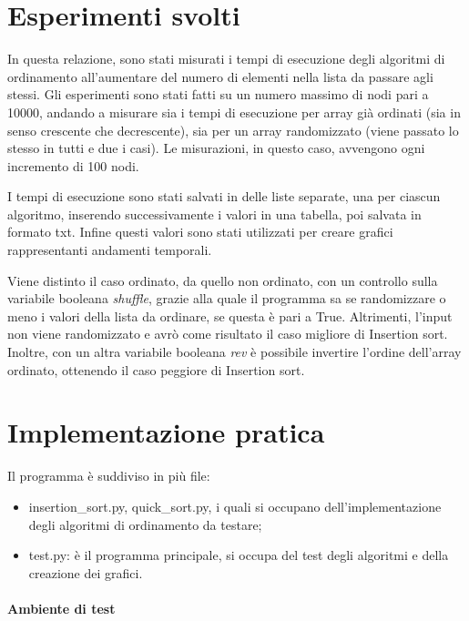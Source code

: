 \documentclass[
]{article}
\providecommand{\tightlist}{%
  \setlength{\itemsep}{0pt}\setlength{\parskip}{0pt}}
\begin{document}
\hypertarget{esperimenti-svolti}{%
\section{Esperimenti svolti}\label{esperimenti-svolti}}

In questa relazione, sono stati misurati i tempi di esecuzione degli
algoritmi di ordinamento all'aumentare del numero di elementi nella
lista da passare agli stessi. Gli esperimenti sono stati fatti su un
numero massimo di nodi pari a 10000, andando a misurare sia i tempi di
esecuzione per array già ordinati (sia in senso crescente che
decrescente), sia per un array randomizzato (viene passato lo stesso in
tutti e due i casi). Le misurazioni, in questo caso, avvengono ogni
incremento di 100 nodi.

I tempi di esecuzione sono stati salvati in delle liste separate, una
per ciascun algoritmo, inserendo successivamente i valori in una
tabella, poi salvata in formato txt. Infine questi valori sono stati
utilizzati per creare grafici rappresentanti andamenti temporali.

Viene distinto il caso ordinato, da quello non ordinato, con un
controllo sulla variabile booleana \emph{shuffle}, grazie alla quale il
programma sa se randomizzare o meno i valori della lista da ordinare, se
questa è pari a True. Altrimenti, l'input non viene randomizzato e avrò
come risultato il caso migliore di Insertion sort. Inoltre, con un altra
variabile booleana \emph{rev} è possibile invertire l'ordine dell'array
ordinato, ottenendo il caso peggiore di Insertion sort.

\hypertarget{implementazione-pratica}{%
\section{Implementazione pratica}\label{implementazione-pratica}}

Il programma è suddiviso in più file:

\begin{itemize}
\tightlist
\item
  insertion\_sort.py, quick\_sort.py, i quali si occupano
  dell'implementazione degli algoritmi di ordinamento da testare;
\item
  test.py: è il programma principale, si occupa del test degli algoritmi
  e della creazione dei grafici.
\end{itemize}

\hypertarget{ambiente-di-test}{%
\paragraph{Ambiente di test}\label{ambiente-di-test}}
\end{document}
